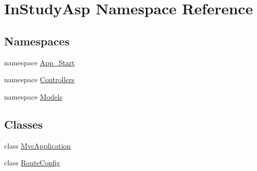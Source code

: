 \hypertarget{namespace_in_study_asp}{}\section{In\+Study\+Asp Namespace Reference}
\label{namespace_in_study_asp}
\subsection*{Namespaces}
\begin{DoxyCompactItemize}
\item 
namespace \hyperlink{namespace_in_study_asp_1_1_app___start}{App\+\_\+\+Start}
\item 
namespace \hyperlink{namespace_in_study_asp_1_1_controllers}{Controllers}
\item 
namespace \hyperlink{namespace_in_study_asp_1_1_models}{Models}
\end{DoxyCompactItemize}
\subsection*{Classes}
\begin{DoxyCompactItemize}
\item 
class \hyperlink{class_in_study_asp_1_1_mvc_application}{Mvc\+Application}
\item 
class \hyperlink{class_in_study_asp_1_1_route_config}{Route\+Config}
\end{DoxyCompactItemize}
